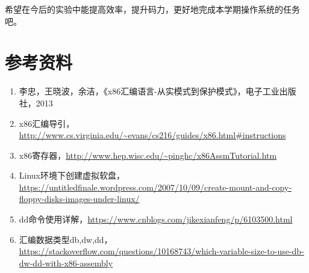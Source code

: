 \documentclass[logo,reportComp]{thesis}
\begin{document}
希望在今后的实验中能提高效率，提升码力，更好地完成本学期操作系统的任务吧。

\section{参考资料}
\begin{enumerate}
	\item 李忠，王晓波，余洁，《x86汇编语言-从实模式到保护模式》，电子工业出版社，2013
	\item x86汇编导引，\url{http://www.cs.virginia.edu/~evans/cs216/guides/x86.html#instructions}
	\item x86寄存器，\url{http://www.hep.wisc.edu/~pinghc/x86AssmTutorial.htm}
	\item Linux环境下创建虚拟软盘，\url{https://untitledfinale.wordpress.com/2007/10/09/create-mount-and-copy-floppy-disks-images-under-linux/}
	\item dd命令使用详解，\url{https://www.cnblogs.com/jikexianfeng/p/6103500.html}
	\item 汇编数据类型db,dw,dd，\url{https://stackoverflow.com/questions/10168743/which-variable-size-to-use-db-dw-dd-with-x86-assembly}
\end{enumerate}

\appendix
\appendixconfig
\end{document}
